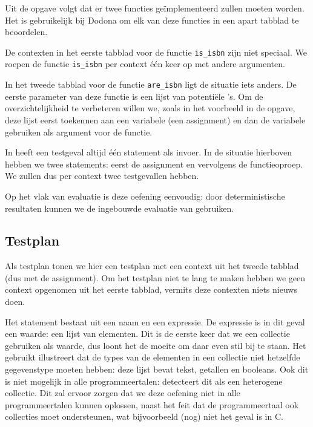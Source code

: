 Uit de opgave volgt dat er twee functies geïmplementeerd zullen moeten worden.
Het is gebruikelijk bij Dodona om elk van deze functies in een apart tabblad te beoordelen.

De contexten in het eerste tabblad voor de functie \texttt{is\_isbn} zijn niet speciaal.
We roepen de functie \texttt{is\_isbn} per context één keer op met andere argumenten.

In het tweede tabblad voor de functie \texttt{are\_isbn} ligt de situatie iets anders.
De eerste parameter van deze functie is een lijst van potentiële 's.
Om de overzichtelijkheid te verbeteren willen we, zoals in het voorbeeld in de opgave, deze lijst eerst toekennen aan een variabele (een assignment) en dan de variabele gebruiken als argument voor de functie.

In \tested{} heeft een testgeval altijd één statement als invoer.
In de situatie hierboven hebben we twee statements: eerst de assignment en vervolgens de functieoproep.
We zullen dus per context twee testgevallen hebben.

Op het vlak van evaluatie is deze oefening eenvoudig: door deterministische resultaten kunnen we de ingebouwde evaluatie van \tested{} gebruiken.

\subsection{Testplan}\label{subsec:oefening-isbn-testplan}

Als testplan tonen we hier een testplan met een context uit het tweede tabblad (dus met de assignment).
Om het testplan niet te lang te maken hebben we geen context opgenomen uit het eerste tabblad, vermits deze contexten niets nieuws doen.

Het statement bestaat uit een naam en een expressie.
De expressie is in dit geval een waarde: een lijst van elementen.
Dit is de eerste keer dat we een collectie gebruiken als waarde, dus loont het de moeite om daar even stil bij te staan.
Het gebruikt illustreert dat de types van de elementen in een collectie niet hetzelfde gegevenstype moeten hebben: deze lijst bevat tekst, getallen en booleans.
Ook dit is niet mogelijk in alle programmeertalen: \tested{} detecteert dit als een heterogene collectie.
Dit zal ervoor zorgen dat we deze oefening niet in alle programmeertalen kunnen oplossen, naast het feit dat de programmeertaal ook collecties moet ondersteunen, wat bijvoorbeeld (nog) niet het geval is in C\@.


